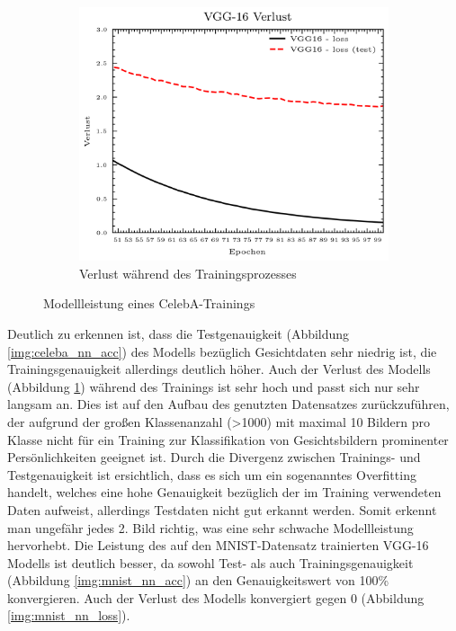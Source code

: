 \begin{figure}[H]
\begin{subfigure}[b]{0.35\linewidth}
		\includegraphics[width=\linewidth]{Bilder/celeba_nn_loss.png}
		\caption{Verlust während des Trainingsprozesses}
		\label{img:celeba_nn_loss}
	\end{subfigure}
	\caption{Modellleistung eines CelebA-Trainings}
	\label{img:celeba_training}
\end{figure}
 Deutlich zu erkennen ist, dass die Testgenauigkeit (Abbildung \ref{img:celeba_nn_acc}) des Modells bezüglich Gesichtdaten sehr niedrig ist, die Trainingsgenauigkeit allerdings deutlich höher. Auch der Verlust des Modells (Abbildung \ref{img:celeba_nn_loss}) während des Trainings ist sehr hoch und passt sich nur sehr langsam an. Dies ist auf den Aufbau des genutzten Datensatzes zurückzuführen, der aufgrund der großen Klassenanzahl (>1000) mit maximal 10 Bildern pro Klasse nicht für ein Training zur Klassifikation von Gesichtsbildern prominenter Persönlichkeiten geeignet ist. Durch die Divergenz zwischen Trainings- und Testgenauigkeit ist ersichtlich, dass es sich um ein sogenanntes Overfitting handelt, welches eine hohe Genauigkeit bezüglich der im Training verwendeten Daten aufweist, allerdings Testdaten nicht gut erkannt werden. Somit erkennt man ungefähr jedes 2. Bild richtig, was eine sehr schwache Modellleistung hervorhebt. Die Leistung des auf den MNIST-Datensatz trainierten VGG-16 Modells ist deutlich besser, da sowohl Test- als auch Trainingsgenauigkeit (Abbildung \ref{img:mnist_nn_acc}) an den Genauigkeitswert von 100\% konvergieren. Auch der Verlust des Modells konvergiert gegen 0 (Abbildung \ref{img:mnist_nn_loss}).

